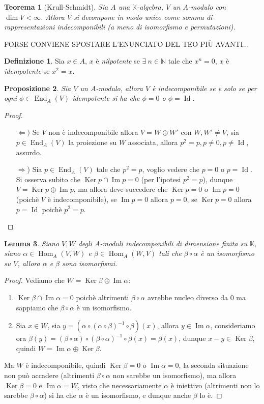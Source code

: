 \documentclass[11pt]{article}
\theoremstyle{plain}
\newtheorem{thm}{Teorema}[section]
\newtheorem{lemma}[thm]{Lemma}
\newtheorem{prop}[thm]{Proposizione}
\theoremstyle{definition}
\newtheorem{defn}{Definizione}[section]
\theoremstyle{remark}
\newcommand{\K}{\mathbb{K}}
\newcommand{\N}{\mathbb{N}}
\DeclareMathOperator{\Hom}{Hom}
\DeclareMathOperator{\End}{End}
\DeclareMathOperator{\Ker}{Ker}
\DeclareMathOperator{\Imm}{Im}
\DeclareMathOperator{\Id}{Id}
\begin{document}
	\begin{thm}[Krull-Schmidt]\label{thm:krull-schmidt}
		Sia $A$ una $\K$-algebra, $V$ un $A$-modulo con $\dim V<\infty$. Allora $V$ si decompone in modo unico come somma di rappresentazioni indecomponibili (a meno di isomorfismo e permutazioni).
	\end{thm}
	FORSE CONVIENE SPOSTARE L'ENUNCIATO DEL TEO PIÙ AVANTI...
	\begin{defn}
		Sia $x\in A$, $x$ è \textit{nilpotente} se $\exists\ n\in \N$ tale che $x^n=0$, $x$ è \textit{idempotente} se $x^2=x$.
	\end{defn}
	\begin{prop}
		Sia $V$ un $A$-modulo, allora $V$ è indecomponibile se e solo se per ogni $\phi\in \End_A(V)$ idempotente si ha che $\phi=0$ o $\phi=\Id$.
	\end{prop}
	\begin{proof}
		\begin{enumerate}
			\item[$\Leftarrow)$] Se $V$ non è indecomponibile allora $V = W\oplus W'$ con $W,W'\neq V$, sia $p\in \End_A(V)$ la proiezione su $W$ associata, allora $p^2=p, p\neq 0, p\neq \Id$, assurdo.
			\item[$\Rightarrow$)]Sia $p\in \End_A(V)$ tale che $p^2=p$, voglio vedere che $p=0$ o $p=\Id$. Si osserva subito che $\Ker p \cap \Imm p = 0$ (per l'ipotesi $p^2=p$), dunque $V=\Ker p\oplus \Imm p$, ma allora deve succedere che $\Ker p = 0$ o $\Imm p = 0$ (poichè $V$ è indecomponibile), se $\Imm p = 0$ allora $p=0$, se $\Ker p=0$ allora $p=\Id$ poichè $p^2=p$.
		\end{enumerate}
	\end{proof}
	\begin{lemma}
		Siano $V,W$ degli $A$-moduli indecomponibili di dimensione finita su $\K$, siano $\alpha\in \Hom_A(V,W)$ e $\beta\in \Hom_A(W,V)$ tali che $\beta\circ\alpha$ è un isomorfismo su $V$, allora $\alpha$ e $\beta$ sono isomorfismi.
	\end{lemma}
	\begin{proof}
		Vediamo che $W=\Ker\beta\oplus\Imm \alpha$:
		\begin{enumerate}
			\item $\Ker \beta\cap\Imm\alpha = 0$ poichè altrimenti $\beta\circ\alpha$ avrebbe nucleo diverso da $0$ ma sappiamo che $\beta\circ\alpha$ è un isomorfismo.
			\item Sia $x\in W$, sia $y=\left( \alpha\circ(\alpha\circ\beta)^{-1}\circ\beta \right)(x)$, allora $y\in \Imm \alpha$, consideriamo ora $\beta(y) = (\beta\circ\alpha)\circ(\beta\circ\alpha)^{-1}\circ\beta(x) = \beta(x)$, dunque $x-y\in \Ker \beta$, quindi $W=\Imm \alpha \oplus \Ker \beta$.
		\end{enumerate}
		Ma $W$ è indecomponibile, quindi $\Ker \beta = 0$ o $\Imm \alpha = 0$, la seconda situazione non può accadere (altrimenti $\beta\circ\alpha$ non sarebbe un isomorfismo), ma allora $\Ker \beta = 0$ e $\Imm \alpha = W$, visto che necessariamente $\alpha$ è iniettivo (altrimenti non lo sarebbe $\beta\circ\alpha$) si ha che $\alpha$ è un isomorfismo, e dunque anche $\beta$ lo è.
	\end{proof}
\end{document}
